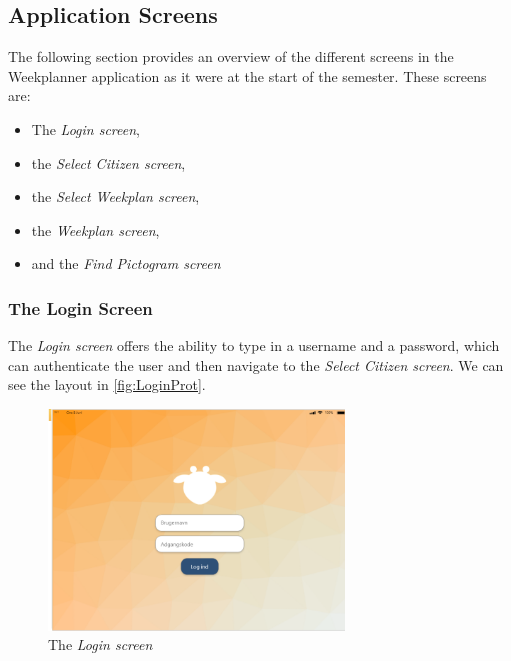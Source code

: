 \subsection{Application Screens}

The following section provides an overview of the different screens in the Weekplanner application as it were at the start of the semester. These screens are:

\begin{itemize}
    \item The \textit{Login screen},
    \item the \textit{Select Citizen screen}, 
    \item the \textit{Select Weekplan screen}, 
    \item the \textit{Weekplan screen},
    \item and the \textit{Find Pictogram screen}
\end{itemize}

\subsubsection{The Login Screen}

The \textit{Login screen} offers the ability to type in a username and a password, which can authenticate the user and then navigate to the \textit{Select Citizen screen}. We can see the layout in \autoref{fig:LoginProt}.

\begin{figure}[H]
    \begin{center}
        \includegraphics[width=0.7\textwidth]{figures/Prototypes/LoginScreenPrototype.png}
    \end{center}
    \caption{The \textit{Login screen}}
    \label{fig:LoginProt}
\end{figure}

